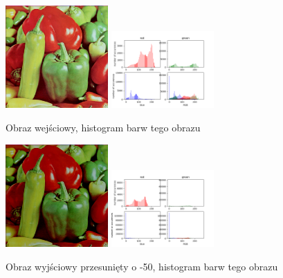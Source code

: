\documentclass[final,a4paper,openany,12pt]{mwbk}
\begin{document}
\begin{figure}[H]
	\begin{center}
		\includegraphics[width=0.35\textwidth]{peppers_color}
		\includegraphics[width=0.35\textwidth]{peppers_color_histogram}
	\end{center}
	\caption{Obraz wejściowy, histogram barw tego obrazu}
\end{figure}

\begin{figure}[H]
	\begin{center}
		\includegraphics[width=0.35\textwidth]{peppers_color_moveHist_result}
		\includegraphics[width=0.35\textwidth]{peppers_color_moveHist_histogram}
	\end{center}
	\caption{Obraz wyjściowy przesunięty o -50, histogram barw tego obrazu}
\end{figure}
\end{document}
